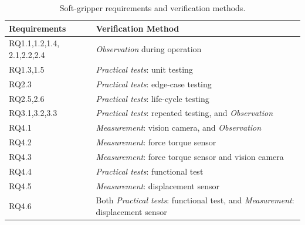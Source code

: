 \documentclass[letterpaper, 10 pt, conference]{ieeeconf}  %
\begin{document}
	
	\begin{table}%
		\centering
		\caption{\label{Table:Verifiability} Soft-gripper requirements and verification methods.}
		\begin{tabular}{|p{16mm}|p{65mm}|}
			\hline
			\textbf{Requirements} & \textbf{Verification Method} \\ 
			\hline
			RQ1.1,1.2,1.4, 2.1,2.2,2.4 & \emph{Observation} during operation\\%
			\hline
			RQ1.3,1.5 & \emph{Practical tests}: unit testing  \\
			\hline
			RQ2.3 & \emph{Practical tests}: edge-case testing \\
			\hline
			RQ2.5,2.6 & \emph{Practical tests}: life-cycle testing \\
			\hline
			RQ3.1,3.2,3.3 & \emph{Practical tests}: repeated testing, and \emph{Observation} \\
			\hline
			RQ4.1 & \emph{Measurement}: vision camera, and \emph{Observation}  \\ 
			\hline
			RQ4.2 & \emph{Measurement}: force torque sensor \\ 
			\hline
			RQ4.3 & \emph{Measurement}: force torque sensor and vision camera  \\ 
			\hline
			RQ4.4 & \emph{Practical tests}: functional test\\ 
			\hline
			RQ4.5 & \emph{Measurement}: displacement sensor   \\ 
			\hline
			RQ4.6 & Both \emph{Practical tests}: functional test, and \emph{Measurement}: displacement sensor \\ 
			\hline
		\end{tabular}\vspace{-2.7ex}
	\end{table}
\end{document}
